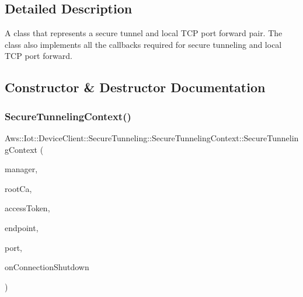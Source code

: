 \subsection{Detailed Description}
A class that represents a secure tunnel and local T\+CP port forward pair. The class also implements all the callbacks required for secure tunneling and local T\+CP port forward. 

\subsection{Constructor \& Destructor Documentation}
\mbox{\label{class_aws_1_1_iot_1_1_device_client_1_1_secure_tunneling_1_1_secure_tunneling_context_a7619ca8a373c28c33a59615f69d6a2fc}} 
\subsubsection{\texorpdfstring{Secure\+Tunneling\+Context()}{SecureTunnelingContext()}}
{\footnotesize\ttfamily Aws\+::\+Iot\+::\+Device\+Client\+::\+Secure\+Tunneling\+::\+Secure\+Tunneling\+Context\+::\+Secure\+Tunneling\+Context (\begin{DoxyParamCaption}\item[{std\+::shared\+\_\+ptr$<$ \hyperlink{class_aws_1_1_iot_1_1_device_client_1_1_shared_crt_resource_manager}{Shared\+Crt\+Resource\+Manager} $>$}]{manager,  }\item[{const std\+::string \&}]{root\+Ca,  }\item[{const std\+::string \&}]{access\+Token,  }\item[{const std\+::string \&}]{endpoint,  }\item[{uint16\+\_\+t}]{port,  }\item[{On\+Connection\+Shutdown\+Fn}]{on\+Connection\+Shutdown }\end{DoxyParamCaption})}



